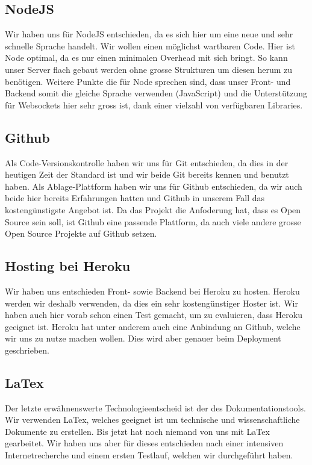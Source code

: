 	\subsection{NodeJS}
	Wir haben uns für NodeJS entschieden, da es sich hier um eine neue und sehr schnelle Sprache handelt. Wir wollen einen möglichst wartbaren Code. Hier ist Node optimal, da es nur einen minimalen Overhead mit sich bringt. So kann unser Server flach gebaut werden ohne grosse Strukturen um diesen herum zu benötigen. Weitere Punkte die für Node sprechen sind, dass unser Front- und Backend somit die gleiche Sprache verwenden (JavaScript) und die Unterstützung für Websockets hier sehr gross ist, dank einer vielzahl von verfügbaren Libraries.

	\subsection{Github}
	Als Code-Versionskontrolle haben wir uns für Git entschieden, da dies in der heutigen Zeit der Standard ist und wir beide Git bereits kennen und benutzt haben. Als Ablage-Plattform haben wir uns für Github entschieden, da wir auch beide hier bereits Erfahrungen hatten und Github in unserem Fall das kostengünstigste Angebot ist. Da das Projekt die Anfoderung hat, dass es Open Source sein soll, ist Github eine passende Plattform, da auch viele andere grosse Open Source Projekte auf Github setzen.

	\subsection{Hosting bei Heroku}
	Wir haben uns entschieden Front- sowie Backend bei Heroku zu hosten. Heroku werden wir deshalb verwenden, da dies ein sehr kostengünstiger Hoster ist. Wir haben auch hier vorab schon einen Test gemacht, um zu evaluieren, dass Heroku geeignet ist. Heroku hat unter anderem auch eine Anbindung an Github, welche wir uns zu nutze machen wollen. Dies wird aber genauer beim Deployment geschrieben.

	\subsection{LaTex}
	Der letzte erwähnenswerte Technologieentscheid ist der des Dokumentationstools. Wir verwenden LaTex, welches geeignet ist um technische und wissenschaftliche Dokumente zu erstellen. Bis jetzt hat noch niemand von uns mit LaTex gearbeitet. Wir haben uns aber für dieses entschieden nach einer intensiven Internetrecherche und einem ersten Testlauf, welchen wir durchgeführt haben.

